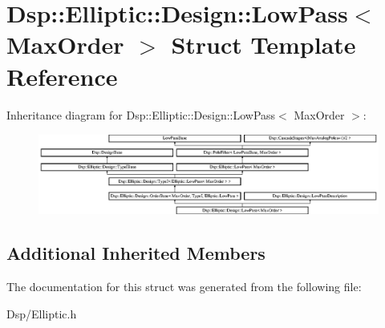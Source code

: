 \hypertarget{structDsp_1_1Elliptic_1_1Design_1_1LowPass}{\section{Dsp\-:\-:Elliptic\-:\-:Design\-:\-:Low\-Pass$<$ Max\-Order $>$ Struct Template Reference}
\label{structDsp_1_1Elliptic_1_1Design_1_1LowPass}
}
Inheritance diagram for Dsp\-:\-:Elliptic\-:\-:Design\-:\-:Low\-Pass$<$ Max\-Order $>$\-:\begin{figure}[H]
\begin{center}
\leavevmode
\includegraphics[height=2.654028cm]{structDsp_1_1Elliptic_1_1Design_1_1LowPass}
\end{center}
\end{figure}
\subsection*{Additional Inherited Members}


The documentation for this struct was generated from the following file\-:\begin{DoxyCompactItemize}
\item 
Dsp/Elliptic.\-h\end{DoxyCompactItemize}
